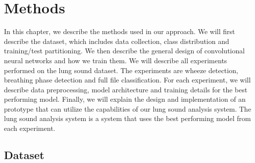 \chapter{Methods}
In this chapter, we describe the methods used in our approach. We will first describe the dataset, which includes data collection, class distribution and training/test partitioning. We then describe the general design of convolutional neural networks and how we train them. We will describe all experiments performed on the lung sound dataset. The experiments are wheeze detection, breathing phase detection and full file classification. For each experiment, we will describe data preprocessing, model architecture and training details for the best performing model. Finally, we will explain the design and implementation of an prototype that can utilize the capabilities of our lung sound analysis system. The lung sound analysis system is a system that uses the best performing model from each experiment.

\section{Dataset}
